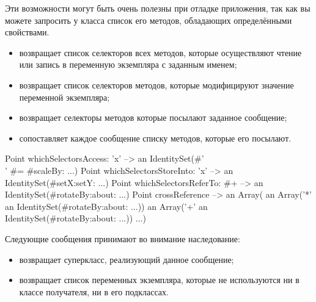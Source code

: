 \documentclass[a4paper,10pt,twoside]{book}
\begin{document}
Эти возможности могут быть очень полезны при отладке приложения, так как вы можете запросить у класса список его методов, обладающих определёнными свойствами.
\begin{itemize}
\item {} возвращает список селекторов всех методов, которые осуществляют чтение или запись в переменную экземпляра с заданным именем;
\item {} возвращает список селекторов методов, которые модифицируют значение переменной экземпляра;
\item {} возвращает селекторы методов которые посылают заданное сообщение;
\item {} сопоставляет каждое сообщение списку методов, которые его посылают.
\end{itemize}

\begin{code}{} %
Point whichSelectorsAccess: 'x'    --> an IdentitySet(#'\\' #= #scaleBy: ...)
Point whichSelectorsStoreInto: 'x' --> an IdentitySet(#setX:setY: ...)
Point whichSelectorsReferTo: #+  --> an IdentitySet(#rotateBy:about: ...)
Point crossReference --> an Array(
		an Array('*' an IdentitySet(#rotateBy:about: ...))
		an Array('+' an IdentitySet(#rotateBy:about: ...))
		...)
\end{code}

Следующие сообщения принимают во внимание наследование:
\begin{itemize}
\item {} возвращает суперкласс, реализующий данное сообщение;
\item {} возвращает список переменных экземпляра, которые не используются ни в классе получателя, ни в его подклассах.
\end{itemize}
\end{document}
